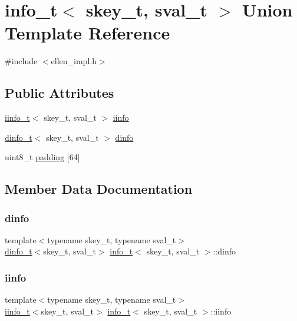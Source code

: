 \hypertarget{unioninfo__t}{}\section{info\+\_\+t$<$ skey\+\_\+t, sval\+\_\+t $>$ Union Template Reference}
\label{unioninfo__t}


{\ttfamily \#include $<$ellen\+\_\+impl.\+h$>$}

\subsection*{Public Attributes}
\begin{DoxyCompactItemize}
\item 
\hyperlink{structiinfo__t}{iinfo\+\_\+t}$<$ skey\+\_\+t, sval\+\_\+t $>$ \hyperlink{unioninfo__t_a422b1155c4af5af9b6696789fedb790a}{iinfo}
\item 
\hyperlink{structdinfo__t}{dinfo\+\_\+t}$<$ skey\+\_\+t, sval\+\_\+t $>$ \hyperlink{unioninfo__t_acb3605bfd5bde422fa2f628c90fbd224}{dinfo}
\item 
uint8\+\_\+t \hyperlink{unioninfo__t_a4ebfec4af276b167babd6ce6e9536efe}{padding} \mbox{[}64\mbox{]}
\end{DoxyCompactItemize}


\subsection{Member Data Documentation}
\mbox{\label{unioninfo__t_acb3605bfd5bde422fa2f628c90fbd224}} 
\subsubsection{\texorpdfstring{dinfo}{dinfo}}
{\footnotesize\ttfamily template$<$typename skey\+\_\+t, typename sval\+\_\+t$>$ \\
\hyperlink{structdinfo__t}{dinfo\+\_\+t}$<$skey\+\_\+t, sval\+\_\+t$>$ \hyperlink{unioninfo__t}{info\+\_\+t}$<$ skey\+\_\+t, sval\+\_\+t $>$\+::dinfo}

\mbox{\label{unioninfo__t_a422b1155c4af5af9b6696789fedb790a}} 
\subsubsection{\texorpdfstring{iinfo}{iinfo}}
{\footnotesize\ttfamily template$<$typename skey\+\_\+t, typename sval\+\_\+t$>$ \\
\hyperlink{structiinfo__t}{iinfo\+\_\+t}$<$skey\+\_\+t, sval\+\_\+t$>$ \hyperlink{unioninfo__t}{info\+\_\+t}$<$ skey\+\_\+t, sval\+\_\+t $>$\+::iinfo}

